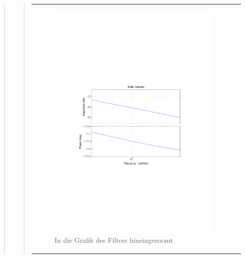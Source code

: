 \begin{quote}
\begin{quote}
\begin{center}
\begin{tabular}{ll}
            \begin{minipage}{0.6\textwidth}
                \begin{figure}[H]
                    \label{fig:butter_2}
                    \includegraphics[scale=0.7, trim = 3.5cm 7cm 3.5cm 7cm, clip]{Bilder/butter_2_zoom} %
                    \caption{In die Grafik des Filters hineingezoomt}
                \end{figure}
            \vspace{-0.4cm}
                                    
            \end{minipage}
        
        \end{tabular}
        \end{center}
            

\end{quote}
\end{quote}

